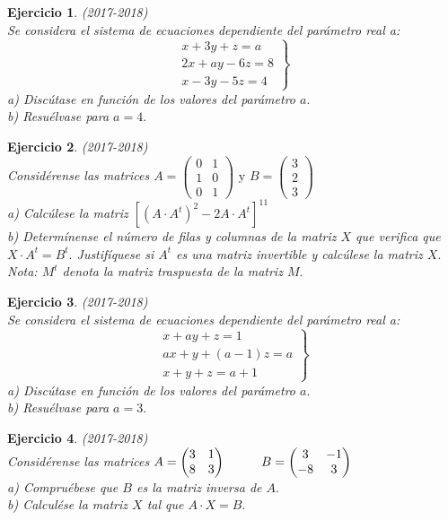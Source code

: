 \documentclass[12pt, a4paper]{amsart}
\newtheorem{ejer}{Ejercicio}
\begin{document}
\begin{ejer}\em (2017-2018)\\
Se considera el sistema de ecuaciones dependiente del parámetro real a:
\[
\left. \begin{matrix}
x+3y+z=a
\\ 2x+ay-6z=8
\\  x-3y-5z=4
\end{matrix}  \right \}
\]
a) Discútase en función de los valores del parámetro $a.$\\
b) Resuélvase para $a = 4.$
\end{ejer}

\begin{ejer}\em (2017-2018)\\
Considérense las matrices $A=\begin{pmatrix}
0 & 1 
\\ 1 & 0
\\ 0 & 1
\end{pmatrix} \text{ y } B=\begin{pmatrix}
3 
\\ 2
\\ 3
\end{pmatrix}$\\
a) Calcúlese la matriz $[(A\cdot A^t)^2-2A\cdot A^t]^{11}$\\
b) Determínense el número de filas y columnas de la matriz $X$ que verifica que $X\cdot A^t = B^t.$ Justifíquese si $A^t$ es una matriz invertible y calcúlese la matriz $X .$\\
Nota: $M^t$ denota la matriz traspuesta de la matriz $M.$
\end{ejer}

\begin{ejer}\em (2017-2018)\\
Se considera el sistema de ecuaciones dependiente del parámetro real a:
\[
\left. \begin{matrix}
x+ay+z=1
\\ ax+y+(a-1)z = a
\\  x+y+z=a+1
\end{matrix}  \right \}
\]
a) Discútase en función de los valores del parámetro $a.$\\
b) Resuélvase para $a = 3.$
\end{ejer}

\begin{ejer}\em (2017-2018)\\
Considérense las matrices $A=\begin{pmatrix}
3 & 1 
\\ 8 & 3
\end{pmatrix} \hspace*{1cm} B=\begin{pmatrix}
3 & -1
\\ -8 & 3
\end{pmatrix}$\\
a) Compruébese que $B$ es la matriz inversa de $A.$\\
b) Calculése la matriz $X$ tal que $A \cdot X = B.$
\end{ejer}
\end{document}
